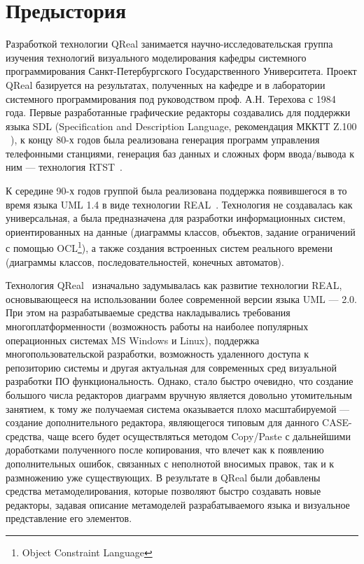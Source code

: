 \documentclass[a4paper]{article}
\begin{document}
\section{Предыстория}

Разработкой технологии QReal занимается научно-исследовательская группа изучения технологий визуального моделирования кафедры системного программирования Санкт-Петербургского Государственного Университета. Проект QReal базируется на результатах, полученных на кафедре и в лаборатории системного программирования под руководством проф. А.Н. Терехова с 1984 года. Первые разработанные графические редакторы создавались для поддержки языка SDL (Specification and Description Language, рекомендация МККТТ Z.100 ~\cite{sdl}), к концу 80-х годов была реализована генерация программ управления телефонными станциями, генерация баз данных и сложных форм ввода/вывода к ним — технология RTST~\cite{rtst}. 

К середине 90-х годов группой была реализована поддержка появившегося в то время языка UML 1.4 в виде технологии REAL~\cite{real}. Технология не создавалась как универсальная, а была предназначена для разработки информационных систем, ориентированных на данные (диаграммы классов, объектов, задание ограничений с помощью OCL\footnote{Object Constraint Language}), а также создания встроенных систем реального времени (диаграммы классов, последовательностей, конечных автоматов). 

Технология QReal~\cite{qreal}  изначально задумывалась как развитие технологии REAL, основывающееся на использовании более современной версии языка UML --- 2.0. При этом на разрабатываемые средства накладывались требования многоплатформенности (возможность работы на наиболее популярных операционных системах MS Windows и Linux), поддержка многопользовательской разработки, возможность удаленного доступа к репозиторию системы и другая актуальная для современных сред визуальной разработки ПО функциональность. Однако, стало быстро очевидно, что создание большого числа редакторов диаграмм вручную является довольно утомительным занятием, к тому же получаемая система оказывается плохо масштабируемой --- создание дополнительного редактора, являющегося типовым для данного CASE-средства, чаще всего будет осуществляться методом Copy/Paste с дальнейшими доработками полученного после копирования, что влечет как к появлению дополнительных ошибок, связанных с неполнотой вносимых правок, так и к размножению уже существующих. В результате в QReal были добавлены средства метамоделирования, которые позволяют быстро создавать новые редакторы, задавая описание метамоделей разрабатываемого языка и визуальное представление его элементов.
\end{document}
